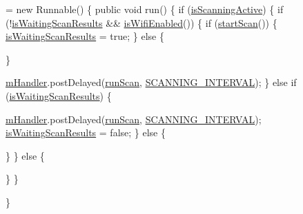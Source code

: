 \begin{DoxyCode}
= \textcolor{keyword}{new} Runnable() \{
                \textcolor{keyword}{public} \textcolor{keywordtype}{void} run() \{
                        \textcolor{keywordflow}{if} (\hyperlink{classeu_1_1uloop_1_1mobilitytracker_1_1MTrackerWifiManager_a3ddfdf614c661fa2e487608063104b5d}{isScanningActive}) \{
                                \textcolor{keywordflow}{if} (!\hyperlink{classeu_1_1uloop_1_1mobilitytracker_1_1MTrackerWifiManager_aa8093ed424fc284bb785cff6900e5ea4}{isWaitingScanResults} && 
      \hyperlink{classeu_1_1uloop_1_1mobilitytracker_1_1MTrackerWifiManager_a2a7c3866f9c861c69dc5538704e61f3a}{isWifiEnabled}()) \{
                                        \textcolor{keywordflow}{if} (\hyperlink{classeu_1_1uloop_1_1mobilitytracker_1_1MTrackerWifiManager_ad2b16d54d73844b90ca70c3f5db5dc99}{startScan}()) \{
                                                \hyperlink{classeu_1_1uloop_1_1mobilitytracker_1_1MTrackerWifiManager_aa8093ed424fc284bb785cff6900e5ea4}{isWaitingScanResults} = \textcolor{keyword}{true};
                                        \}
                                        \textcolor{keywordflow}{else} \{
                                                
                                        \}
                                        
                                        \hyperlink{classeu_1_1uloop_1_1mobilitytracker_1_1MTrackerWifiManager_a4ae9d37ad258e6924a4ece10984013ee}{mHandler}.postDelayed(\hyperlink{classeu_1_1uloop_1_1mobilitytracker_1_1MTrackerWifiManager_a0aed1c15634c782fa21ca690865ef3cf}{runScan}, 
      \hyperlink{classeu_1_1uloop_1_1mobilitytracker_1_1MTrackerWifiManager_a3955e253a5cb506942b9a803ad39efbd}{SCANNING\_INTERVAL});
                                \}
                                \textcolor{keywordflow}{else} \textcolor{keywordflow}{if} (\hyperlink{classeu_1_1uloop_1_1mobilitytracker_1_1MTrackerWifiManager_aa8093ed424fc284bb785cff6900e5ea4}{isWaitingScanResults}) \{
                                        
                                \hyperlink{classeu_1_1uloop_1_1mobilitytracker_1_1MTrackerWifiManager_a4ae9d37ad258e6924a4ece10984013ee}{mHandler}.postDelayed(\hyperlink{classeu_1_1uloop_1_1mobilitytracker_1_1MTrackerWifiManager_a0aed1c15634c782fa21ca690865ef3cf}{runScan}, 
      \hyperlink{classeu_1_1uloop_1_1mobilitytracker_1_1MTrackerWifiManager_a3955e253a5cb506942b9a803ad39efbd}{SCANNING\_INTERVAL});
                                \hyperlink{classeu_1_1uloop_1_1mobilitytracker_1_1MTrackerWifiManager_aa8093ed424fc284bb785cff6900e5ea4}{isWaitingScanResults} = \textcolor{keyword}{false};
                                \}
                                \textcolor{keywordflow}{else} \{
                                        
                                \}
                        \}
                        \textcolor{keywordflow}{else} \{
                                
                        \}
                \}
                
        \}
\end{DoxyCode}
